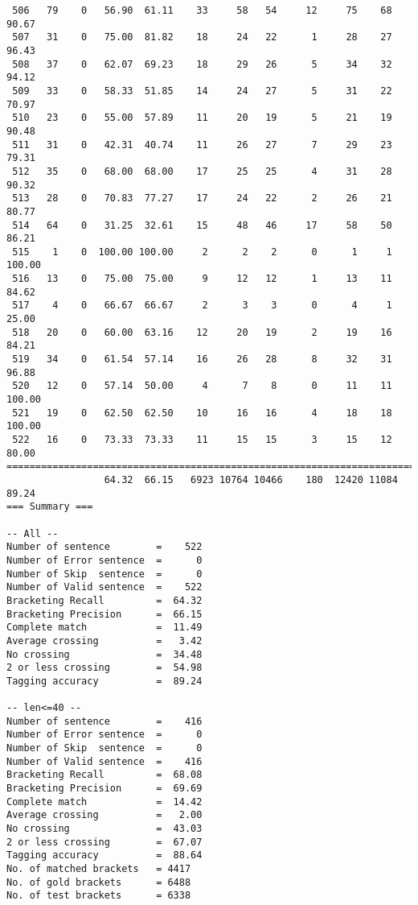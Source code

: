 \begin{verbatim}
 506   79    0   56.90  61.11    33     58   54     12     75    68    90.67
 507   31    0   75.00  81.82    18     24   22      1     28    27    96.43
 508   37    0   62.07  69.23    18     29   26      5     34    32    94.12
 509   33    0   58.33  51.85    14     24   27      5     31    22    70.97
 510   23    0   55.00  57.89    11     20   19      5     21    19    90.48
 511   31    0   42.31  40.74    11     26   27      7     29    23    79.31
 512   35    0   68.00  68.00    17     25   25      4     31    28    90.32
 513   28    0   70.83  77.27    17     24   22      2     26    21    80.77
 514   64    0   31.25  32.61    15     48   46     17     58    50    86.21
 515    1    0  100.00 100.00     2      2    2      0      1     1   100.00
 516   13    0   75.00  75.00     9     12   12      1     13    11    84.62
 517    4    0   66.67  66.67     2      3    3      0      4     1    25.00
 518   20    0   60.00  63.16    12     20   19      2     19    16    84.21
 519   34    0   61.54  57.14    16     26   28      8     32    31    96.88
 520   12    0   57.14  50.00     4      7    8      0     11    11   100.00
 521   19    0   62.50  62.50    10     16   16      4     18    18   100.00
 522   16    0   73.33  73.33    11     15   15      3     15    12    80.00
============================================================================
                 64.32  66.15   6923 10764 10466    180  12420 11084    89.24
=== Summary ===

-- All --
Number of sentence        =    522
Number of Error sentence  =      0
Number of Skip  sentence  =      0
Number of Valid sentence  =    522
Bracketing Recall         =  64.32
Bracketing Precision      =  66.15
Complete match            =  11.49
Average crossing          =   3.42
No crossing               =  34.48
2 or less crossing        =  54.98
Tagging accuracy          =  89.24

-- len<=40 --
Number of sentence        =    416
Number of Error sentence  =      0
Number of Skip  sentence  =      0
Number of Valid sentence  =    416
Bracketing Recall         =  68.08
Bracketing Precision      =  69.69
Complete match            =  14.42
Average crossing          =   2.00
No crossing               =  43.03
2 or less crossing        =  67.07
Tagging accuracy          =  88.64
No. of matched brackets   = 4417
No. of gold brackets      = 6488
No. of test brackets      = 6338

\end{verbatim}

\normalsize

